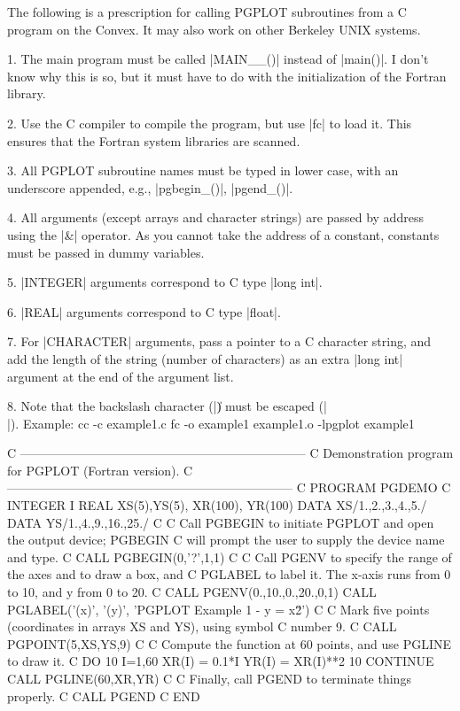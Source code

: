 The following is a prescription for calling PGPLOT subroutines from
a C program on the Convex. It may also work on other Berkeley UNIX 
systems.
\smallskip
\item{1.} The main program must be called |MAIN__()| instead of |main()|. 
	I don't know why this is so, but it must have to do with the
	initialization of the Fortran library.
\item{2.} Use the C compiler to compile the program, but use |fc| to load it. 
	This ensures that the Fortran system libraries are scanned.
\item{3.} All PGPLOT subroutine names must be typed in lower case, with an 
underscore appended, e.g., |pgbegin_()|, |pgend_()|.
\item{4.} All arguments (except arrays and character strings) are passed by
address using the |&| operator. As you cannot take the address of a 
constant, constants must be passed in dummy variables.
\item{5.} |INTEGER| arguments correspond to C type |long int|.
\item{6.} |REAL| arguments correspond to C type |float|.
\item{7.} For |CHARACTER| arguments, pass a pointer to a C character string,
and add the length of the string (number of characters) as an extra
|long int| argument at the end of the argument list.
\item{8.} Note that the backslash character (|\|) must be escaped (|\\|).
\smallskip
Example:
\begintt
cc -c example1.c
fc -o example1 example1.o -lpgplot
example1
\endtt

\pageinsert
\eightpoint
\begintt
C ---------------------------------------------------------------------
C Demonstration program for PGPLOT (Fortran version).
C ---------------------------------------------------------------------
C
      PROGRAM PGDEMO
C
      INTEGER I
      REAL XS(5),YS(5), XR(100), YR(100)
      DATA XS/1.,2.,3.,4.,5./
      DATA YS/1.,4.,9.,16.,25./
C
C Call PGBEGIN to initiate PGPLOT and open the output device; PGBEGIN
C will prompt the user to supply the device name and type.
C
      CALL PGBEGIN(0,'?',1,1)
C
C Call PGENV to specify the range of the axes and to draw a box, and
C PGLABEL to label it. The x-axis runs from 0 to 10, and y from 0 to 20.
C
      CALL PGENV(0.,10.,0.,20.,0,1)
      CALL PGLABEL('(x)', '(y)', 'PGPLOT Example 1 - y = x\u2')
C
C Mark five points (coordinates in arrays XS and YS), using symbol
C number 9.
C
      CALL PGPOINT(5,XS,YS,9)
C
C Compute the function at 60 points, and use PGLINE to draw it.
C
      DO 10 I=1,60
          XR(I) = 0.1*I
          YR(I) = XR(I)**2
   10 CONTINUE
      CALL PGLINE(60,XR,YR)
C
C Finally, call PGEND to terminate things properly.
C
      CALL PGEND
C
      END
\endtt
\vfill
\endinsert

